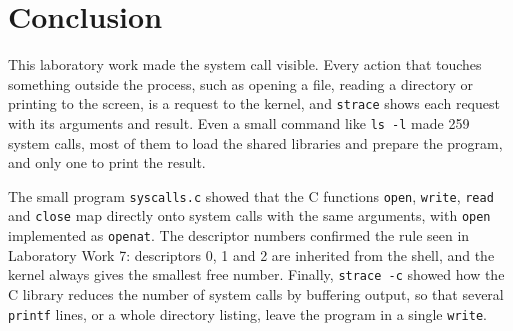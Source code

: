 \documentclass[12pt,a4paper]{article}
\begin{document}
\newpage
\section*{Conclusion}

This laboratory work made the system call visible. Every action that touches something outside the process, such as opening a file, reading a directory or printing to the screen, is a request to the kernel, and \texttt{strace} shows each request with its arguments and result. Even a small command like \texttt{ls -l} made 259 system calls, most of them to load the shared libraries and prepare the program, and only one to print the result.

The small program \texttt{syscalls.c} showed that the C functions \texttt{open}, \texttt{write}, \texttt{read} and \texttt{close} map directly onto system calls with the same arguments, with \texttt{open} implemented as \texttt{openat}. The descriptor numbers confirmed the rule seen in Laboratory Work 7: descriptors 0, 1 and 2 are inherited from the shell, and the kernel always gives the smallest free number. Finally, \texttt{strace -c} showed how the C library reduces the number of system calls by buffering output, so that several \texttt{printf} lines, or a whole directory listing, leave the program in a single \texttt{write}.
\end{document}
